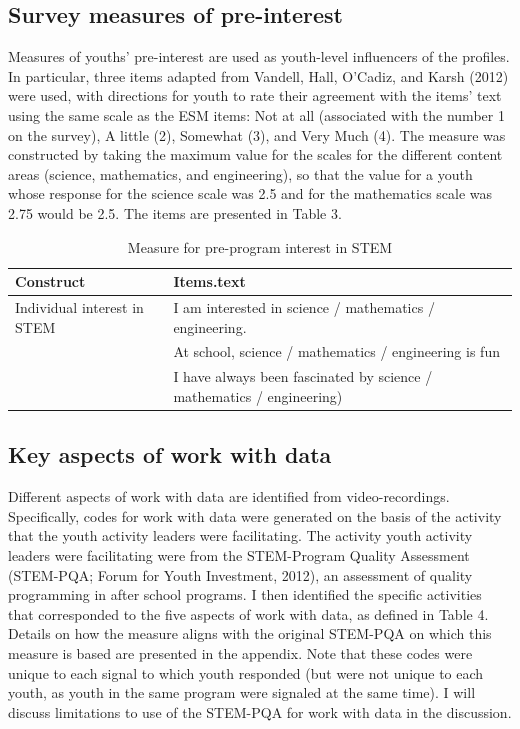 \documentclass[]{msu-thesis}
\theoremstyle{definition}
\theoremstyle{definition}
\theoremstyle{definition}
\theoremstyle{remark}
\begin{document}
\subsection{Survey measures of
pre-interest}\label{survey-measures-of-pre-interest}

Measures of youths' pre-interest are used as youth-level influencers of
the profiles. In particular, three items adapted from Vandell, Hall,
O'Cadiz, and Karsh (2012) were used, with directions for youth to rate
their agreement with the items' text using the same scale as the ESM
items: Not at all (associated with the number 1 on the survey), A little
(2), Somewhat (3), and Very Much (4). The measure was constructed by
taking the maximum value for the scales for the different content areas
(science, mathematics, and engineering), so that the value for a youth
whose response for the science scale was 2.5 and for the mathematics
scale was 2.75 would be 2.5. The items are presented in Table 3.

\begin{table}

\caption{\label{tab:unnamed-chunk-5}Measure for pre-program interest in STEM}
\centering
\begin{tabular}[t]{ll}
\toprule
Construct & Items.text\\
\midrule
Individual interest in STEM & I am interested in science / mathematics / engineering.\\
 & At school, science / mathematics / engineering is fun\\
 & I have always been fascinated by science / mathematics / engineering)\\
\bottomrule
\end{tabular}
\end{table}

\subsection{Key aspects of work with
data}\label{key-aspects-of-work-with-data}

Different aspects of work with data are identified from
video-recordings. Specifically, codes for work with data were generated
on the basis of the activity that the youth activity leaders were
facilitating. The activity youth activity leaders were facilitating were
from the STEM-Program Quality Assessment (STEM-PQA; Forum for Youth
Investment, 2012), an assessment of quality programming in after school
programs. I then identified the specific activities that corresponded to
the five aspects of work with data, as defined in Table 4. Details on
how the measure aligns with the original STEM-PQA on which this measure
is based are presented in the appendix. Note that these codes were
unique to each signal to which youth responded (but were not unique to
each youth, as youth in the same program were signaled at the same
time). I will discuss limitations to use of the STEM-PQA for work with
data in the discussion.
\end{document}
